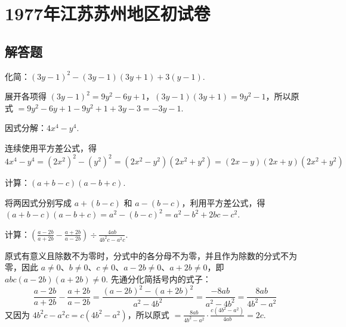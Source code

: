 \chapter{1977年江苏苏州地区初试卷}

\section{解答题}

\begin{problem}
化简：\(\left(3y-1\right)^2-\left(3y-1\right)\left(3y+1\right)+3\left(y-1\right)\).
\end{problem}

\begin{solution}
展开各项得 \(\left(3y-1\right)^2=9y^2-6y+1\)，\(\left(3y-1\right)\left(3y+1\right)=9y^2-1\)，所以原式 \(=9y^2-6y+1-9y^2+1+3y-3=-3y-1\).
\end{solution}

\begin{problem}
因式分解：\(4x^4-y^4\).
\end{problem}

\begin{solution}
连续使用平方差公式，得
\[
4x^4-y^4=\left(2x^2\right)^2-\left(y^2\right)^2=\left(2x^2-y^2\right)\left(2x^2+y^2\right)=\left(2x-y\right)\left(2x+y\right)\left(2x^2+y^2\right)
\]
\end{solution}

\begin{problem}
计算：\(\left(a+b-c\right)\left(a-b+c\right)\).
\end{problem}

\begin{solution}
将两因式分别写成 \(a+(b-c)\) 和 \(a-(b-c)\)，利用平方差公式，得 \(\left(a+b-c\right)\left(a-b+c\right)=a^2-(b-c)^2=a^2-b^2+2bc-c^2\).
\end{solution}

\begin{problem}
计算：\(\left(\frac{a-2b}{a+2b}-\frac{a+2b}{a-2b}\right)\div\frac{4ab}{4b^2c-a^2c}\).
\end{problem}

\begin{solution}
原式有意义且除数不为零时，分式中的各分母不为零，并且作为除数的分式不为零，因此
\(a\ne0\)、\(b\ne0\)、\(c\ne0\)、\(a-2b\ne0\)、\(a+2b\ne0\)，即
\(abc(a-2b)(a+2b)\ne0\). 先通分化简括号内的式子：
\[
\frac{a-2b}{a+2b}-\frac{a+2b}{a-2b}=\frac{(a-2b)^2-(a+2b)^2}{a^2-4b^2}=\frac{-8ab}{a^2-4b^2}=\frac{8ab}{4b^2-a^2}
\]
又因为 \(4b^2c-a^2c=c(4b^2-a^2)\)，所以原式
\(=\frac{8ab}{4b^2-a^2}\cdot\frac{c(4b^2-a^2)}{4ab}=2c\).
\end{solution}


